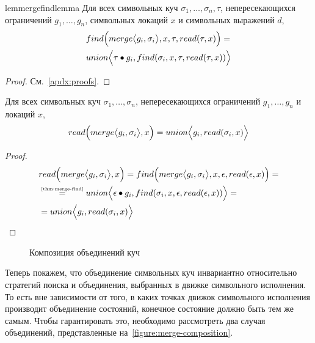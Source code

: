 %
\begin{restatable}{lem}{mergefindlemma}\label{thm:merge-find}
Для всех символьных куч $\sigma_1,\ldots,\sigma_n, \tau$, непересекающихся ограничений $g_1,\ldots,g_n$, символьных локаций $x$ и символьных выражений $d$,
\begin{align*}
&find\Big(merge\big\langle g_i, \sigma_i\big\rangle,x,\tau,read(\tau,x)\Big)=\\
&union\Big\langle\tau\bullet g_i, find(\sigma_i,x,\tau,read(\tau,x))\Big\rangle
\end{align*}
\end{restatable}
\begin{proof}См.~\autoref{apdx:proofs}.
\end{proof}
%
\begin{thm}\label{thm:merge-read}
Для всех символьных куч $\sigma_1,\ldots,\sigma_n$, непересекающихся ограничений $g_1,\ldots,g_n$ и локаций $x$,
\begin{align*}
read\Big(merge\big\langle g_i, \sigma_i\big\rangle,x\Big)=union\Big\langle g_i, read(\sigma_i,x)\Big\rangle
\end{align*}
\end{thm}
\begin{proof}
\begin{align*}
&\DereF{\amerge\paiR{g_i}{\sigma_i}}{x}=\Find{\amerge\paiR{g_i}{\sigma_i}}{x}{\emptyheap}{\deref{\emptyheap}{x}}=\\
&\eqby{\autoref{thm:merge-find}}\aunion\Pair{\fillterm{\emptyheap}{g_i}}{\find{\sigma_i}{x}{\emptyheap}{\deref{\emptyheap}{x}}}=\\
&=\aunion\Pair{g_i}{\deref{\sigma_i}{x}}
\end{align*}
\end{proof}
%
\vspace{-0.5in}
\begin{figure}[H]
\centering
\begin{minipage}[t]{.45\textwidth}
	\resizebox{\textwidth}{!}{\mergeleftpict}
\end{minipage}
\begin{minipage}[t]{.45\textwidth}
	\resizebox{\textwidth}{!}{\mergerightpict}
\end{minipage}
\caption{Композиция объединений куч}
\label{figure:merge-composition}
\end{figure}
\vspace{-0.3in}
%
Теперь покажем, что объединение символьных куч инвариантно относительно стратегий поиска и объединения, выбранных в движке символьного исполнения. То есть вне зависимости от того, в каких точках движок символьного исполнения производит объединение состояний, конечное состояние должно быть тем же самым. Чтобы гарантировать это, необходимо рассмотреть два случая объединений, представленные на~\autoref{figure:merge-composition}.
